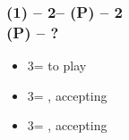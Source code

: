 \documentclass[12pt, a4paper]{article}
\begin{document}
\subsubsection*{(1\hearts) -- 2\hearts -- (P) -- 2\nt\\
                (P) -- ?}
\begin{itemize}
    \item 3\minor = to play
    \item 3\hearts = \clubs, accepting \inv
    \item 3\spades = \diams, accepting \inv
\end{itemize}

\end{document}
